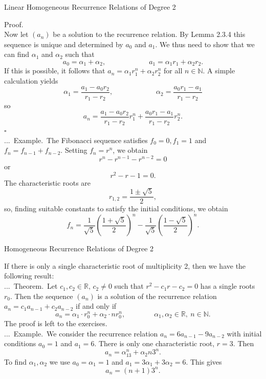 \documentclass[smaller,hyperref={CJKbookmarks=true}]{beamer}
\newcommand{\N}{\mathbb{N}} \newcommand{\Z}{\mathbb{Z}} \newcommand{\Q}{\mathbb{Q}}
\newcommand{\R}{\mathbb{R}}
\newenvironment{PROOF}{{\noindent\!\sf\alert{Proof.}}\\}{\hfill$\square$\\}
\newcounter{zhuo}[subsection]
\renewcommand{\thezhuo}{\thesection.\thesubsection.\arabic{zhuo}}
\newenvironment{EXAMPLE}{\stepcounter{zhuo}\alert{\!\thezhuo.~Example.\,}}{}
\newenvironment{THEOREM}{\stepcounter{zhuo}\alert{\thezhuo.~Theorem.\,}}{}
\begin{document}
\begin{frame}{Linear Homogeneous Recurrence Relations of Degree 2}
\begin{spacing}{1.05}
\begin{PROOF}
Now let $(a_n)$ be a solution to the recurrence relation. By Lemma 2.3.4 this sequence is unique and determined by $a_0$ and $a_1$. We thus need to show that we can find $\alpha_1$ and $\alpha_2$ such that
\[a_0=\alpha_1+\alpha_2,\qquad\qquad\qquad
a_1=\alpha_1r_1+\alpha_2r_2.\]
If this is possible, it follows that $a_n=\alpha_1r_1^n+\alpha_2r_2^n$ for all $n\in\N$. A simple calculation yields
\[\alpha_1=\frac{a_1-a_0r_2}{r_1-r_2},\qquad\qquad
\qquad \alpha_2=\frac{a_0r_1-a_1}{r_1-r_2}\]
so
\begin{equation*}
  a_n=\frac{a_1-a_0r_2}{r_1-r_2}r_1^n+\frac{a_0r_1-a_1}{r_1-r_2}r_2^n.
\end{equation*}
\end{PROOF}
\newpage
\begin{EXAMPLE}
The Fibonacci sequence satisfies $f_0=0,f_1=1$ and $f_n=f_{n-1}+f_{n-2}$. Setting $f_n=r^n$, we obtain
\[r^n-r^{n-1}-r^{n-2}=0\]
or
\[r^2-r-1=0.\]
The characteristic roots are
\[r_{1,2}=\frac{1\pm\sqrt{5}}{2},\]
so, finding suitable constants to satisfy the initial conditions, we obtain
\[f_n=\frac{1}{\sqrt{5}}\left(\frac{1+\sqrt{5}}{2}\right)^n-\frac{1}{\sqrt{5}}
\left(\frac{1-\sqrt{5}}{2}\right)^n.\]
\end{EXAMPLE}
\end{spacing}
\end{frame}
\begin{frame}[t]{Homogeneous Recurrence Relations of Degree 2}
\begin{spacing}{1}
If there is only a single characteristic root of multiplicity 2, then we have
the following result:\\[4pt]
\begin{THEOREM}
Let $c_1,c_2\in\R,\,c_2\neq0$ such that $r^2-c_1r-c_2=0$ has a single roots $r_0$. Then the sequence $(a_n)$ is a solution of the recurrence relation $a_n=c_1a_{n-1}+c_2a_{n-2}$ if and only if
\[a_n=\alpha_1\cdot r_0^n+\alpha_2\cdot nr_0^n,\qquad\qquad
\alpha_1,\alpha_2\in\R,\:n\in\N.\]
The proof is left to the exercises.\\[4pt]
\begin{EXAMPLE}
We consider the recurrence relation $a_n=6a_{n-1}-9a_{n-2}$ with initial conditions $a_0=1$ and $a_1=6$. There is only one characteristic root, $r=3$. Then
\[a_n=\alpha_13^n+\alpha_2n3^n.\]
To find $\alpha_1,\alpha_2$ we use $a_0=\alpha_1=1$ and $a_1=3\alpha_1+3\alpha_2=6$. This gives
\[a_n=(n+1)3^n.\]
\end{EXAMPLE}
\end{THEOREM}
\end{spacing}
\end{frame}
\end{document}
